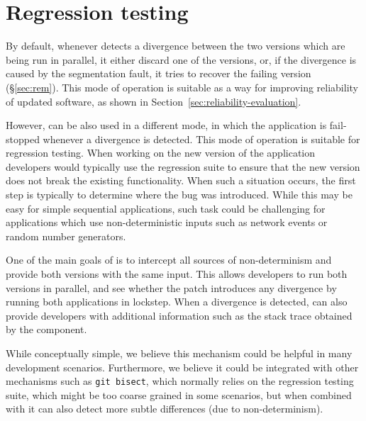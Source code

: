 \section{Regression testing}
\label{sec:testing}

By default, whenever \mx detects a divergence between the two versions which
are being run in parallel, it either discard one of the versions, or, if the
divergence is caused by the segmentation fault, it tries to recover the failing
version (\S\ref{sec:rem}). This mode of operation is suitable as a way for
improving reliability of updated software, as shown in
Section~\ref{sec:reliability-evaluation}.

However, \mx can be also used in a different mode, in which the application is
fail-stopped whenever a divergence is detected. This mode of operation is
suitable for regression testing. When working on the new version of the
application developers would typically use the regression suite to ensure that
the new version does not break the existing functionality. When such a situation
occurs, the first step is typically to determine where the bug was introduced.
While this may be easy for simple sequential applications, such task could be
challenging for applications which use non-deterministic inputs such as network
events or random number generators.

One of the main goals of \mx is to intercept all sources of non-determinism and
provide both versions with the same input. This allows developers to run both
versions in parallel, and see whether the patch introduces any divergence by
running both applications in lockstep. When a divergence is detected, \mx can
also provide developers with additional information such as the stack trace
obtained by the \rem component.

While conceptually simple, we believe this mechanism could be helpful in many
development scenarios. Furthermore, we believe it could be integrated with
other mechanisms such as \lstinline`git bisect`, which normally relies on the
regression testing suite, which might be too coarse grained in some scenarios,
but when combined with \mx it can also detect more subtle differences (\eg due
to non-determinism).
